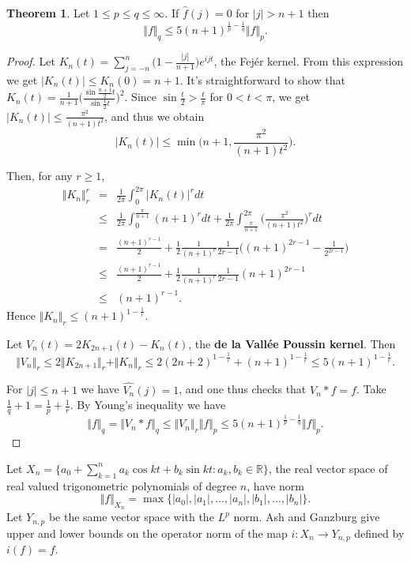 \documentclass{article}
\newcommand{\norm}[1]{\Vert #1 \Vert}
\theoremstyle{definition}
\newtheorem{theorem}{Theorem}
\begin{document}
\begin{theorem}
Let $1 \leq p \leq q \leq \infty$.
If $\hat{f}(j)=0$ for $|j|>n+1$ then
\[
\norm{f}_q \leq 5(n+1)^{\frac{1}{p}-\frac{1}{q}} \norm{f}_p.
\]
\end{theorem}
\begin{proof}
Let $K_n(t)=\sum_{j=-n}^n \Big(1-\frac{|j|}{n+1}\Big)e^{ijt}$, the Fej\'er kernel.
From this expression we get $|K_n(t)| \leq K_n(0)= n+1$.
 It's straightforward to show
that $K_n(t)=\frac{1}{n+1}\Big(\frac{\sin \frac{n+1}{2}t}{\sin \frac{1}{2}t} \Big)^2$.
Since $\sin \frac{t}{2}>\frac{t}{\pi}$ for $0 < t < \pi$, we get $|K_n(t)| \leq   \frac{\pi^2}{(n+1)t^2}$, and
thus we obtain
\[
|K_n(t)| \leq \min\Big(n+1, \frac{\pi^2}{(n+1)t^2} \Big).
\]

Then, for any $r \geq 1$,
\begin{eqnarray*}
\norm{K_n}_r^r&=&\frac{1}{2\pi} \int_0^{2\pi} |K_n(t)|^r dt\\
&\leq&\frac{1}{2\pi} \int_0^{\frac{\pi}{n+1}} (n+1)^r dt
+\frac{1}{2\pi} \int_{\frac{\pi}{n+1}}^{2\pi} \Big(\frac{\pi^2}{(n+1)t^2}\Big)^r dt\\
&=&\frac{(n+1)^{r-1}}{2} 
+\frac{1}{2}\frac{1}{(n+1)^r}\frac{1}{2r-1}\Big( (n+1)^{2r-1}-\frac{1}{2^{2r-1}}\Big)\\
&\leq&\frac{(n+1)^{r-1}}{2} 
+\frac{1}{2}\frac{1}{(n+1)^r}\frac{1}{2r-1}(n+1)^{2r-1}\\
&\leq&(n+1)^{r-1}.
\end{eqnarray*}
Hence $\norm{K_n}_r \leq (n+1)^{1-\frac{1}{r}}$.

Let $V_n(t)=2K_{2n+1}(t)-K_n(t)$, the \textbf{de la Vall\'ee Poussin kernel}.
Then
\[
\norm{V_n}_r \leq 2\norm{K_{2n+1}}_r+\norm{K_n}_r \leq 2(2n+2)^{1-\frac{1}{r}}+(n+1)^{1-\frac{1}{r}}
\leq 5(n+1)^{1-\frac{1}{r}}.
\]

For $|j| \leq n+1$ we have $\widehat{V_n}(j)=1$, and one thus checks that $V_n * f=f$. Take $\frac{1}{q}+1=\frac{1}{p}+\frac{1}{r}$.
By
Young's inequality we have 
\[
\norm{f}_q=\norm{V_n * f}_q \leq \norm{V_n}_r \norm{f}_p
\leq 5(n+1)^{\frac{1}{p}-\frac{1}{q}} \norm{f}_p.
\]
\end{proof}

Let $X_n=\{a_0+\sum_{k=1}^n a_k \cos kt + b_k \sin kt: a_k, b_k \in \mathbb{R}\}$, the real vector space of real valued trigonometric polynomials of degree $n$, have
norm
\[
\norm{f}_{X_n}=\max \{|a_0|, |a_1|,\ldots,|a_n|, |b_1|,\ldots,|b_n|\}.
\]
Let $Y_{n,p}$ be the same vector space with the $L^p$ norm. 
Ash and Ganzburg \cite{MR1458861} give upper and lower bounds on the operator norm of the map $i:X_n \to Y_{n,p}$ defined by $i(f)=f$.
  
\end{document}
